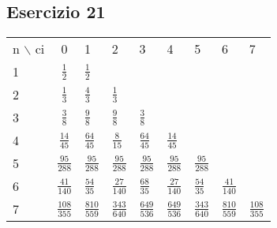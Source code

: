 \subsection{Esercizio 21}


\begin{table}
    \begin{tabular}{|l|c|l|l|l|l|l|l|l|}
        \hline
        n $\backslash$ ci & 0 & 1 & 2 & 3 & 4 & 5 & 6 & 7 \\
        
        1 & $\frac{1}{2}$ & $\frac{1}{2}$ & & & & &  &\\
        
        2 & $\frac{1}{3}$ & $\frac{4}{3}$ & $\frac{1}{3}$ & & & &&\\
        
        3 &  $\frac{3}{8}$ & $\frac{9}{8}$ & $\frac{9}{8}$ & $\frac{3}{8}$ & & & & \\
        
        4 & $\frac{14}{45} $ & $\frac{64}{45} $ & $\frac{8}{15} $ & $\frac{64}{45} $ &$\frac{14}{45} $ &&&\\
        
        5 & $\frac{95}{288}$ & $\frac{95}{288}$ & $\frac{95}{288}$ & $\frac{95}{288}$ & $\frac{95}{288}$ & $\frac{95}{288}$ &&\\
        
        6 & $\frac{41}{140}$ & $\frac{54}{35}$ & $\frac{27}{140}$ & $\frac{68}{35}$ & $\frac{27}{140}$ & $\frac{54}{35}$ & $\frac{41}{140}$ &\\
        
        7 & $\frac{108}{355}$ & $\frac{810}{559}$ & $\frac{343}{640}$ & $\frac{649}{536}$ & $\frac{649}{536}$  & $\frac{343}{640}$ & $\frac{810}{559}$ & $\frac{108}{355}$\\
        
    \end{tabular}
\end{table}